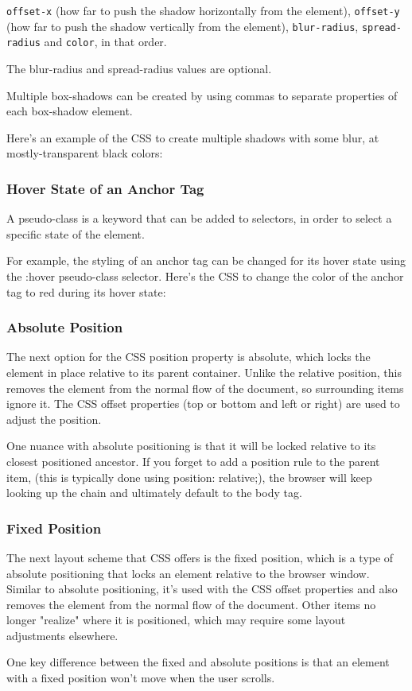     \texttt{offset-x} (how far to push the shadow horizontally from the element),
    \texttt{offset-y} (how far to push the shadow vertically from the element),
    \texttt{blur-radius},
    \texttt{spread-radius} and
    \texttt{color}, in that order.

The blur-radius and spread-radius values are optional.

Multiple box-shadows can be created by using commas to separate properties of each box-shadow element.

Here's an example of the CSS to create multiple shadows with some blur, at mostly-transparent black colors:


\subsubsection{Hover State of an Anchor Tag}
A pseudo-class is a keyword that can be added to selectors, in order to select a specific state of the element.

For example, the styling of an anchor tag can be changed for its hover state using the :hover pseudo-class selector. Here's the CSS to change the color of the anchor tag to red during its hover state:


\subsubsection{Absolute Position}


The next option for the CSS position property is absolute, which locks the element in place relative to its parent container. Unlike the relative position, this removes the element from the normal flow of the document, so surrounding items ignore it. The CSS offset properties (top or bottom and left or right) are used to adjust the position.

One nuance with absolute positioning is that it will be locked relative to its closest positioned ancestor. If you forget to add a position rule to the parent item, (this is typically done using position: relative;), the browser will keep looking up the chain and ultimately default to the body tag.

\subsubsection{Fixed Position}


The next layout scheme that CSS offers is the fixed position, which is a type of absolute positioning that locks an element relative to the browser window. Similar to absolute positioning, it's used with the CSS offset properties and also removes the element from the normal flow of the document. Other items no longer "realize" where it is positioned, which may require some layout adjustments elsewhere.

One key difference between the fixed and absolute positions is that an element with a fixed position won't move when the user scrolls.

